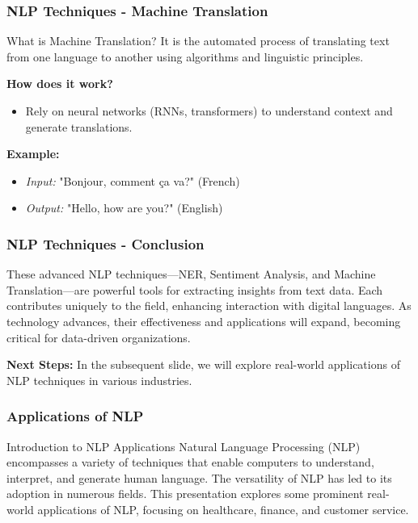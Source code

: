 \documentclass[aspectratio=169]{beamer}
\begin{document}
\begin{frame}[fragile]
    \frametitle{NLP Techniques - Machine Translation}
    \begin{block}{What is Machine Translation?}
      It is the automated process of translating text from one language to another using algorithms and linguistic principles.
    \end{block}

    \textbf{How does it work?}
    \begin{itemize}
        \item Rely on neural networks (RNNs, transformers) to understand context and generate translations.
    \end{itemize}

    \textbf{Example:}
    \begin{itemize}
        \item \textit{Input:} "Bonjour, comment ça va?" (French)
        \item \textit{Output:} "Hello, how are you?" (English)
    \end{itemize}

\end{frame}

\begin{frame}[fragile]
    \frametitle{NLP Techniques - Conclusion}
    These advanced NLP techniques—NER, Sentiment Analysis, and Machine Translation—are powerful tools for extracting insights from text data. Each contributes uniquely to the field, enhancing interaction with digital languages. As technology advances, their effectiveness and applications will expand, becoming critical for data-driven organizations.
    
    \textbf{Next Steps:} In the subsequent slide, we will explore real-world applications of NLP techniques in various industries.
\end{frame}

\begin{frame}[fragile]
    \frametitle{Applications of NLP}
    \begin{block}{Introduction to NLP Applications}
        Natural Language Processing (NLP) encompasses a variety of techniques that enable computers to understand, interpret, and generate human language. The versatility of NLP has led to its adoption in numerous fields. This presentation explores some prominent real-world applications of NLP, focusing on healthcare, finance, and customer service.
    \end{block}
\end{frame}
\end{document}
